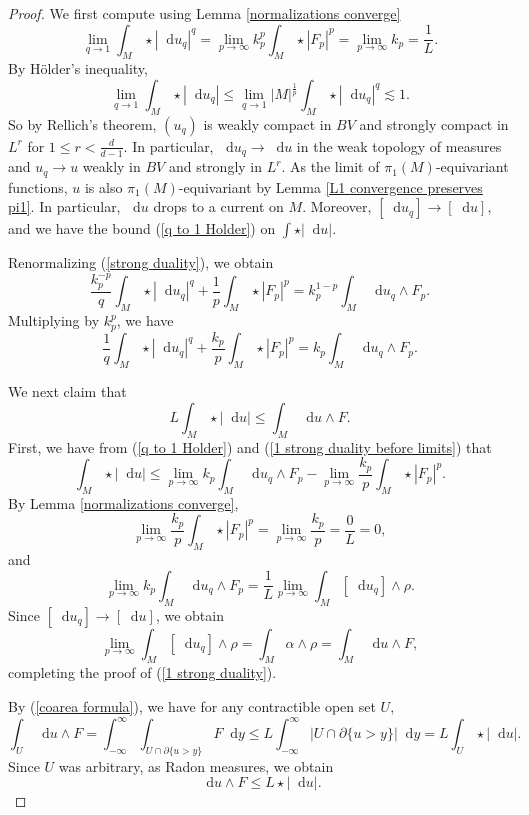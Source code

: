 \documentclass[reqno,11pt]{amsart}
\newcommand*\dif{\mathop{}\!\mathrm{d}}
\theoremstyle{definition}
\numberwithin{equation}{section}
\begin{document}
\begin{proof}
We first compute using Lemma \ref{normalizations converge}
\begin{equation}\label{Lqs of qLaplace converge}
\lim_{q \to 1} \int_M \star |\dif u_q|^q = \lim_{p \to \infty} k_p^p \int_M \star |F_p|^p = \lim_{p \to \infty} k_p = \frac{1}{L}.
\end{equation}
By H\"older's inequality,
$$\lim_{q \to 1} \int_M \star |\dif u_q| \leq \lim_{q \to 1} |M|^{\frac{1}{p}} \int_M \star |\dif u_q|^q \lesssim 1.$$
So by Rellich's theorem, $(u_q)$ is weakly compact in $BV$ and strongly compact in $L^r$ for $1 \leq r < \frac{d}{d - 1}$.
In particular, $\dif u_q \to \dif u$ in the weak topology of measures and $u_q \to u$ weakly in $BV$ and strongly in $L^r$.
As the limit of $\pi_1(M)$-equivariant functions, $u$ is also $\pi_1(M)$-equivariant by Lemma \ref{L1 convergence preserves pi1}.
In particular, $\dif u$ drops to a current on $M$.
Moreover, $[\dif u_q] \to [\dif u]$, and we have the bound (\ref{q to 1 Holder}) on $\int \star |\dif u|$.

Renormalizing (\ref{strong duality}), we obtain 
$$\frac{k_p^{-p}}{q} \int_M \star |\dif u_q|^q + \frac{1}{p} \int_M \star |F_p|^p = k_p^{1 - p} \int_M \dif u_q \wedge F_p.$$
Multiplying by $k_p^p$, we have 
\begin{equation}\label{1 strong duality before limits}
	\frac{1}{q} \int_M \star |\dif u_q|^q + \frac{k_p}{p} \int_M \star |F_p|^p = k_p \int_M \dif u_q \wedge F_p.
\end{equation}

We next claim that
\begin{equation}\label{1 strong duality}
	L \int_M \star |\dif u| \leq \int_M \dif u \wedge F.
\end{equation}
First, we have from (\ref{q to 1 Holder}) and (\ref{1 strong duality before limits}) that
$$\int_M \star |\dif u| \leq \lim_{p \to \infty} k_p \int_M \dif u_q \wedge F_p - \lim_{p \to \infty} \frac{k_p}{p} \int_M \star |F_p|^p.$$
By Lemma \ref{normalizations converge},
$$\lim_{p \to \infty} \frac{k_p}{p} \int_M \star |F_p|^p = \lim_{p \to \infty} \frac{k_p}{p} = \frac{0}{L} = 0,$$
and
$$\lim_{p \to \infty} k_p \int_M \dif u_q \wedge F_p = \frac{1}{L} \lim_{p \to \infty} \int_M [\dif u_q] \wedge \rho.$$
Since $[\dif u_q] \to [\dif u]$, we obtain
$$\lim_{p \to \infty} \int_M [\dif u_q] \wedge \rho = \int_M \alpha \wedge \rho = \int_M \dif u \wedge F,$$
completing the proof of (\ref{1 strong duality}).

By (\ref{coarea formula}), we have for any contractible open set $U$,
$$\int_U \dif u \wedge F = \int_{-\infty}^\infty \int_{U \cap \partial \{u > y\}} F \dif y \leq L \int_{-\infty}^\infty |U \cap \partial \{u > y\}| \dif y = L \int_U \star |\dif u|.$$
Since $U$ was arbitrary, as Radon measures, we obtain
\begin{equation}\label{one sided extremality}
\dif u \wedge F \leq L \star |\dif u|.
\end{equation}


\end{proof}
\end{document}
